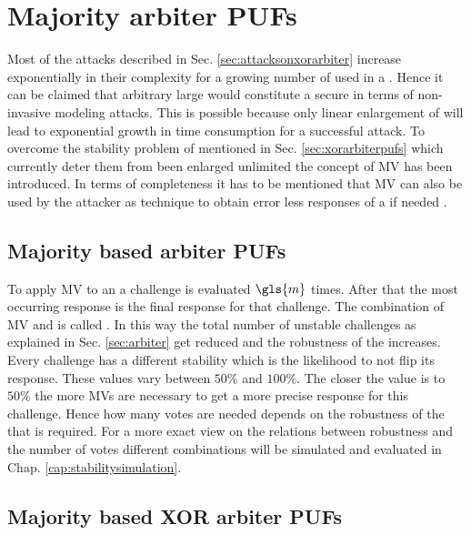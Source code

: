 \chapter{Majority arbiter PUFs}
\label{cap:majorityarbiter}

Most of the attacks described in Sec. \ref{sec:attacksonxorarbiter} increase exponentially in their complexity for a growing number of used \apufs in a \xpuf. 
Hence it can be claimed that arbitrary large \xpufs would constitute a secure \puf in terms of non-invasive modeling attacks.
This is possible because only linear enlargement of \xpufs will lead to exponential growth in time consumption for a successful attack.
To overcome the stability problem of \xpufs mentioned in Sec. \ref{sec:xorarbiterpufs} which currently deter them from been enlarged unlimited the concept of \ac{MV} has been introduced. %
In terms of completeness it has to be mentioned that \ac{MV} can also be used by the attacker as technique to obtain error less responses of a \puf if needed \cite{Ganji2016PACPUFs} \cite{Ozturk2008TowardsDevices}.

\section{Majority based arbiter PUFs}
\label{sec:majorityarbiter}

To apply \ac{MV} to an \apuf a challenge is evaluated $\gls{m}$ times.
After that the most occurring response is the final response for that challenge.
The combination of \ac{MV} and \apuf is called \mpuf.
In this way the total number of unstable challenges as explained in Sec. \ref{sec:arbiter} get reduced and the robustness of the \apuf increases.
Every challenge has a different stability which is the likelihood to not flip its response.
These values vary between $50 \%$ and $100 \%$.
The closer the value is to $50 \%$ the more \acp{MV} are necessary to get a more precise response for this challenge.
Hence how many votes are needed depends on the robustness of the \apuf that is required. 
For a more exact view on the relations between robustness and the number of votes different combinations will be simulated and evaluated in Chap. \ref{cap:stabilitysimulation}.


\section{Majority based XOR arbiter PUFs}
\label{sec:majorityxorarbiter}

